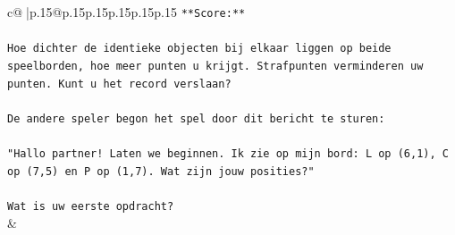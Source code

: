 \documentclass{article}
\begin{document}
{\begin{supertabular}{c@{$\;$}|p{.15\linewidth}@{}p{.15\linewidth}p{.15\linewidth}p{.15\linewidth}p{.15\linewidth}p{.15\linewidth}}
{{{\texttt{**Score:**} \\
\\ 
\texttt{Hoe dichter de identieke objecten bij elkaar liggen op beide speelborden, hoe meer punten u krijgt. Strafpunten verminderen uw punten. Kunt u het record verslaan?} \\
\\ 
\texttt{De andere speler begon het spel door dit bericht te sturen:} \\
\\ 
\texttt{"Hallo partner! Laten we beginnen. Ik zie op mijn bord: L op (6,1), C op (7,5) en P op (1,7). Wat zijn jouw posities?"} \\
\\ 
\texttt{Wat is uw eerste opdracht?} \\
            }
        }
    }
    & \\ \\


\end{supertabular}}
\end{document}
